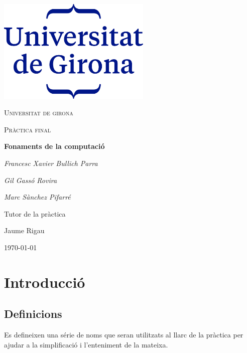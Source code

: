 \documentclass[12pt,a4paper]{report}
\begin{document}
\begin{titlepage}
	\centering
	\includegraphics[width=0.55\textwidth]{udg_logo.png}\par\vspace{1cm}
	{\scshape\LARGE Universitat de girona \par}
	\vspace{1cm}
	{\scshape\Large Pràctica final\par}
	\vspace{1.5cm}
	{\huge\bfseries Fonaments de la computació\par}
	\vspace{2cm}
	{\Large\itshape Francesc Xavier Bullich Parra\par}
	{\Large\itshape Gil Gassó Rovira\par}
	{\Large\itshape Marc Sànchez Pifarré\par}
			
	\vfill
	Tutor de la pràctica\par
	Jaume Rigau

	\vfill

	{\large \today\par}
\end{titlepage}

\tableofcontents
\clearpage


\chapter{Introducció}
\setcounter{chapter}{1}

\section{Definicions}

Es defineixen una série de noms que seran utilitzats al llarc de la pràctica per ajudar a la simplificació i l'enteniment de la mateixa. 
\end{document}
